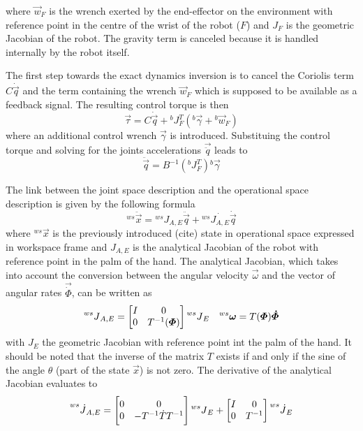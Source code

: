 where $\vec{w}_{F}$ is the wrench exerted by the end-effector on the environment with reference point in the centre
of the wrist of the robot ($F$) and $J_{F}$ is the geometric Jacobian of the robot.
The gravity term is canceled because it is handled internally by the robot itself.
\par
The first step towards the exact dynamics inversion is to cancel the Coriolis term
$C \dot{\vec{q}}$ and the term containing the wrench $\vec{w}_{F}$ which is supposed to
be available as a feedback signal. The resulting control torque is then
\[
\vec{\tau} = C \dot{\vec{q}} + {}^{b}J^{T}_{F} ({}^b\vec{\gamma} + {}^b\vec{w}_{F})
\]
where an additional control wrench $\vec{\gamma}$ is introduced.
Substituing the control torque and solving for the joints accelerations $\vec{\ddot{q}}$
leads to
\begin{equation}\label{eq:qddot}
  \ddot{\vec{q}} = B^{-1} ({}^{b}J^{T}_{F}) {}^b\vec{\gamma}
\end{equation}
\par
The link between the joint space description and the operational space description
is given by the following formula
\begin{equation}
  \label{eq:ws_a}
  {}^{ws} \ddot{\vec{x}} = {}^{ws} J_{A,E} \ddot{\vec{q}} + {}^{ws} \dot{J_{A,E}} \dot{\vec{q}}
\end{equation}
where ${}^{ws} \vec{x}$ is the previously introduced (cite) state in operational space expressed in workspace
frame and $J_{A,E}$ is the analytical Jacobian of the robot with reference point in the palm of the hand.
The analytical Jacobian, which takes into account the conversion between the angular velocity $\vec{\omega}$
and the vector of angular rates $\vec{\dot{\Phi}}$, can be written as
\[
\prescript{ws}{}{J}_{A,E} = 
\begin{bmatrix}
  I & 0 \\
  0 & T^{-1}(\vec{\Phi})
\end{bmatrix}
\prescript{ws}{}{J}_{E} \quad {}^{ws}\vec{\omega} = T(\vec{\Phi}) \vec{\dot{\Phi}}
\]
with $J_E$ the geometric Jacobian with reference point int the palm of the hand. It should be noted
that the inverse of the matrix $T$ exists if and only if the sine of the angle $\theta$ (part of the state
$\vec{x}$) is not zero. The derivative of the analytical Jacobian evaluates to
\[
\prescript{ws}{}{\dot{J}}_{A,E} = 
\begin{bmatrix}
  0 & 0 \\
  0 & -T^{-1} \dot{T} T^{-1}
\end{bmatrix}
\prescript{ws}{}{J}_{E} + 
\begin{bmatrix}
  I & 0 \\
  0 & T^{-1}
\end{bmatrix}
\prescript{ws}{}{\dot{J}}_{E}
\]
